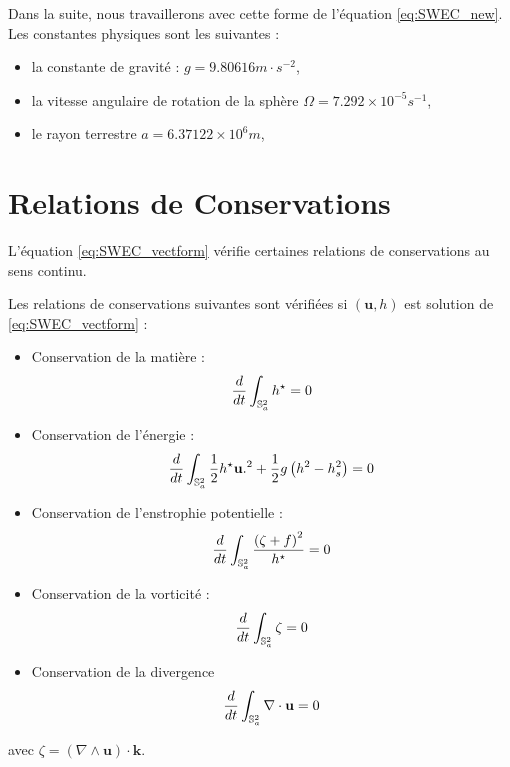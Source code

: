 Dans la suite, nous travaillerons avec cette forme de l'équation \eqref{eq:SWEC_new}. Les constantes physiques sont les suivantes :
\begin{itemize}
\item la constante de gravité : $g=9.80616 m \cdot \si{s^{-2}}$,
\item la vitesse angulaire de rotation de la sphère $\Omega=7.292 \times 10^{-5} \si{s^{-1}}$,
\item le rayon terrestre $a=6.37122 \times 10^6 \si{m}$,
\end{itemize}


\section{Relations de Conservations}

L'équation \eqref{eq:SWEC_vectform} vérifie certaines relations de conservations au sens continu.

\begin{proposition}
Les relations de conservations suivantes sont vérifiées si $(\mathbf{u},h)$ est solution de \eqref{eq:SWEC_vectform} :
\begin{itemize}
\item Conservation de la matière :
\begin{equation}
\dfrac{d}{dt} \displaystyle\int_{\mathbb{S}_a^2} h^{\star} = 0
\label{eq:mass}
\end{equation}
 
\item Conservation de l'énergie :
\begin{equation}
\dfrac{d}{dt} \displaystyle\int_{\mathbb{S}_a^2} \dfrac{1}{2} h^{\star} \mathbf{u}.^2 + \dfrac{1}{2} g \left( h^2 - h_s^2 \right) = 0
\label{eq:energy}
\end{equation}

\item Conservation de l'enstrophie potentielle :
\begin{equation}
\dfrac{d}{dt} \displaystyle\int_{\mathbb{S}_a^2} \dfrac{\left( \zeta + f \right)^2}{h^{\star}} = 0
\label{eq:enstrophie}
\end{equation}

\item Conservation de la vorticité :
\begin{equation}
\dfrac{d}{dt} \displaystyle\int_{\mathbb{S}_a^2} \zeta = 0
\label{eq:vorticity}
\end{equation}

\item Conservation de la divergence
\begin{equation}
\dfrac{d}{dt} \displaystyle\int_{\mathbb{S}_a^2} \nabla \cdot \mathbf{u} = 0
\label{eq:divergence}
\end{equation}
\end{itemize}

avec $\zeta = \left( \nabla \wedge \mathbf{u} \right) \cdot \mathbf{k}$.
\end{proposition}

